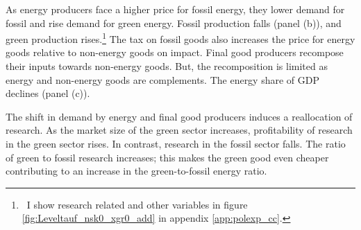   As energy producers face a higher price for fossil energy, they lower demand for fossil and rise demand for green energy. Fossil production falls  (panel (b)), and green production rises.\footnote{\  I show research related and other variables in figure \ref{fig:Leveltauf_nsk0_xgr0_add} in appendix \ref{app:polexp_cc}. 
  }  
 The tax on fossil goods also increases the price for energy goods relative to non-energy goods on impact. Final good producers recompose their inputs towards non-energy goods. But, the recomposition is limited as energy and non-energy goods are complements. The energy share of GDP declines (panel (c)).  
 
 The shift in demand by energy and final good producers induces a reallocation of research. 
 As the market size of the green sector increases, profitability of research in the green sector rises. In contrast, research in the fossil sector falls. The ratio of green to fossil research increases; this makes the green good even cheaper contributing to an increase in the green-to-fossil energy ratio.
 

